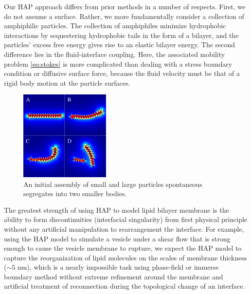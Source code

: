 Our HAP approach differs from prior methods in a number of respects. 
First, we do not assume a surface. Rather, we more fundamentally  consider a collection of amphiphilic particles.
The collection of amphiphiles minimize hydrophobic interactions by sequestering hydrophobic tails in the form of a bilayer, and the particles' excess free energy gives rise to an elastic bilayer energy. 
The second difference lies in the fluid-interface coupling. Here, the associated mobility problem \eqref{eq:stokes} 
is more complicated than dealing with a stress boundary condition or diffusive surface force, 
because the fluid velocity must be that of a rigid body motion at the particle surfaces.
%
\begin{figure}
\centerline{\includegraphics[width=0.4\textwidth]{figures/PW_fig2.pdf}}
\caption{\label{fig:demixing} An initial assembly of small and 
large particles spontaneous segregates into two smaller bodies. }
\end{figure}
The greatest strength of using HAP to model lipid bilayer membrane is the ability
to form discontinuities (interfacial singularity) from first physical principle without any artificial manipulation to rearrangement the interface.
For example, using the HAP model to simulate a vesicle under a shear flow that is strong enough to cause the vesicle membrane to rupture, 
we expect the HAP model to capture the reorganization of lipid molecules on the scales of membrane thickness ($\sim 5$ nm), which is a nearly impossible
task using phase-field or immerse boundary method without extreme refinement around the membrane and artificial treatment of reconnection during the topological change of an interface.


